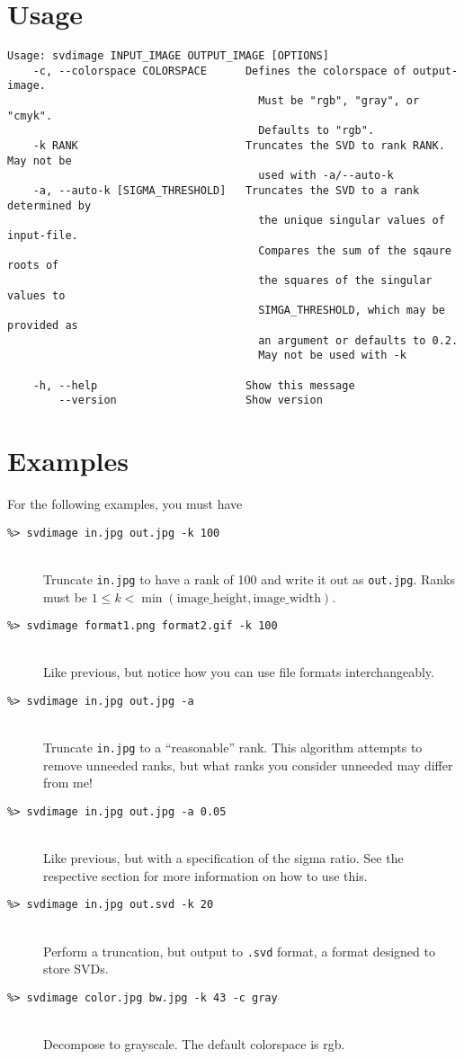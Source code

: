 \documentclass[12pt,letterpaper]{article}
\newcommand{\codeitem}[2]{\item[\texttt{\%> #1}] \hfill \\ #2}
\begin{document}
\section{Usage}
\footnotesize
\begin{verbatim}
Usage: svdimage INPUT_IMAGE OUTPUT_IMAGE [OPTIONS]
    -c, --colorspace COLORSPACE      Defines the colorspace of output-image.
                                       Must be "rgb", "gray", or "cmyk".
                                       Defaults to "rgb".
    -k RANK                          Truncates the SVD to rank RANK. May not be
                                       used with -a/--auto-k
    -a, --auto-k [SIGMA_THRESHOLD]   Truncates the SVD to a rank determined by
                                       the unique singular values of input-file.
                                       Compares the sum of the sqaure roots of
                                       the squares of the singular values to
                                       SIMGA_THRESHOLD, which may be provided as
                                       an argument or defaults to 0.2.
                                       May not be used with -k

    -h, --help                       Show this message
        --version                    Show version
\end{verbatim}
\normalsize

\section{Examples}
For the following examples, you must have 
\begin{description}
\codeitem{svdimage in.jpg out.jpg -k 100}{Truncate \texttt{in.jpg} to have a rank of 100 and write it out as \texttt{out.jpg}. Ranks must be $1 \leq k < \min(\mbox{image\_height}, \mbox{image\_width})$.}
\codeitem{svdimage format1.png format2.gif -k 100}{Like previous, but notice how you can use file formats interchangeably.}
\codeitem{svdimage in.jpg out.jpg -a}{Truncate \texttt{in.jpg} to a ``reasonable'' rank. This algorithm attempts to remove unneeded ranks, but what ranks you consider unneeded may differ from me!}
\codeitem{svdimage in.jpg out.jpg -a 0.05}{Like previous, but with a specification of the sigma ratio. See the respective section for more information on how to use this.}
\codeitem{svdimage in.jpg out.svd -k 20}{Perform a truncation, but output to \texttt{.svd} format, a format designed to store SVDs.}
\codeitem{svdimage color.jpg bw.jpg -k 43 -c gray}{Decompose to grayscale. The default colorspace is rgb.}
\end{description}
\end{document}
